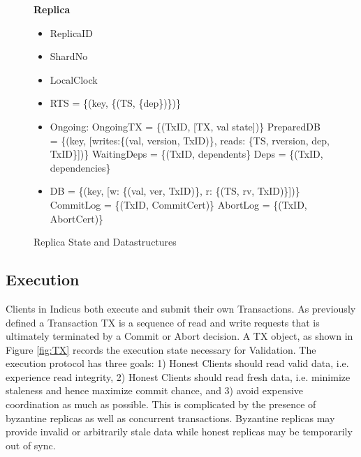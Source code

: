 \newcommand{\SubItem}[1]{
    {\setlength\itemindent{15pt} \item[-] #1}
}

\begin{figure}[t]
  \begin{mdframed}[roundcorner=10pt]
 	\textbf{Replica }
 	\begin{itemize}
 	\item ReplicaID
 	\item ShardNo
 	\item LocalClock
 	\item RTS = \{(key, \{(TS, \{dep\})\})\}
 	\item Ongoing:
 	\subitem OngoingTX = \{(TxID, [TX, val state])\}
 	\subitem PreparedDB = \{(key, [writes:\{(val, version, TxID)\},  reads: \{TS, rversion, dep, TxID\}])\}
 	\subitem WaitingDeps = \{(TxID, dependents\}
 	\subitem Deps = \{(TxID, dependencies\}
 	\item DB = \{(key, [w: \{(val, ver, TxID)\}, r: \{(TS, rv, TxID)\}])\}
 	\subitem CommitLog = \{(TxID, CommitCert)\}
 	\subitem AbortLog = \{(TxID, AbortCert)\}
	 	
 	
 	\end{itemize}
  \end{mdframed}
  \caption{Replica State and Datastructures}
  \label{fig:RS}
\end{figure}



\subsection{Execution}
Clients in Indicus both execute and submit their own Transactions. As previously defined a Transaction TX is a sequence of read and write requests that is ultimately terminated by a Commit or Abort decision. A TX object, as shown in Figure \ref{fig:TX} records the execution state necessary for Validation. The execution protocol has three goals: 1) Honest Clients should read valid data, i.e. experience read integrity, 2) Honest Clients should read fresh data, i.e. minimize staleness and hence maximize commit chance, and 3) avoid expensive coordination as much as possible. This is complicated by the presence of byzantine replicas as well as concurrent transactions. Byzantine replicas may provide invalid or arbitrarily stale data while honest replicas may be temporarily out of sync.

